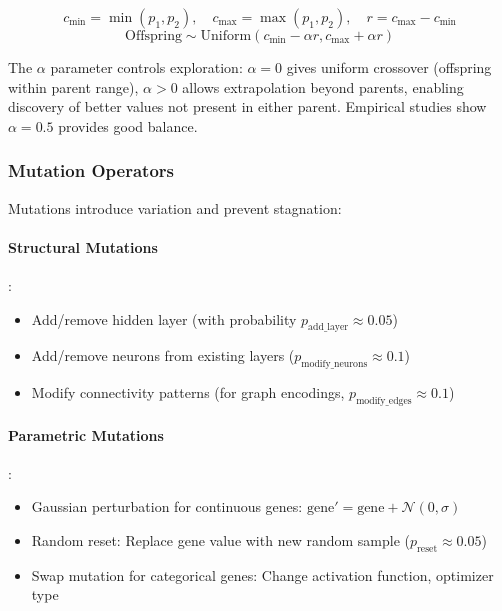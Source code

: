 \begin{equation}
c_{\min} = \min(p_1, p_2), \quad c_{\max} = \max(p_1, p_2), \quad r = c_{\max} - c_{\min}
\end{equation}
\begin{equation}
\text{Offspring} \sim \text{Uniform}(c_{\min} - \alpha r, c_{\max} + \alpha r)
\end{equation}

The $\alpha$ parameter controls exploration: $\alpha=0$ gives uniform crossover (offspring within parent range), $\alpha>0$ allows extrapolation beyond parents, enabling discovery of better values not present in either parent. Empirical studies show $\alpha=0.5$ provides good balance.

\subsubsection{Mutation Operators}

Mutations introduce variation and prevent stagnation:

\paragraph{Structural Mutations}:
\begin{itemize}
    \item Add/remove hidden layer (with probability $p_{\text{add\_layer}} \approx 0.05$)
    \item Add/remove neurons from existing layers ($p_{\text{modify\_neurons}} \approx 0.1$)
    \item Modify connectivity patterns (for graph encodings, $p_{\text{modify\_edges}} \approx 0.1$)
\end{itemize}

\paragraph{Parametric Mutations}:
\begin{itemize}
    \item Gaussian perturbation for continuous genes: $\text{gene}' = \text{gene} + \mathcal{N}(0, \sigma)$
    \item Random reset: Replace gene value with new random sample ($p_{\text{reset}} \approx 0.05$)
    \item Swap mutation for categorical genes: Change activation function, optimizer type
\end{itemize}


